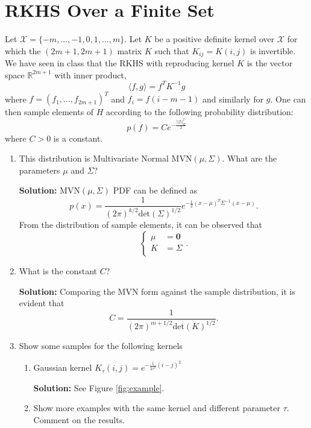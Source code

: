 \documentclass{article}[12pt]
\begin{document}
\section{RKHS Over a Finite Set}
Let $\mathcal{X} = \{-m,\ldots,-1,0,1,\ldots,m\}$. Let $K$ be a positive definite kernel over $\mathcal{X}$ for which the $(2m+1,2m+1)$ matrix $K$ such that $K_{ij}=K(i,j)$ is invertible. We have seen in class that the RKHS with reproducing kernel $K$ is the vector space $\mathbb{R}^{2m+1}$ with inner product, 
$$\langle f,g \rangle = f^T K^{-1}g $$
where $f=(f_1,\ldots,f_{2m+1})^T$ and $f_i=f(i-m-1)$ and similarly for $g$. 
One can then sample elements of $H$ according to the following probability distribution:  
$$p(f) = C e^{-\frac{||f||_H^2}{2}}$$
where $C>0$ is a constant. 
\begin{enumerate}
\item This distribution is Multivariate Normal MVN$(\mu,\Sigma)$. What are the parameters $\mu$ and $\Sigma$?

\textbf{Solution:} MVN$(\mu, \Sigma)$ PDF can be defined as 
	\begin{equation}
		p(x) = \frac{1}{(2\pi)^{k/2} \text{det}(\Sigma)^{1/2}} e^{- \frac{1}{2} (x-\mu)^T \Sigma^{-1} (x-\mu) }. 
	\end{equation}
From the distribution of sample elements, it can be observed that 
	\begin{equation}
		\begin{cases}
			\mu &= \mathbf 0 \\	
			K &= \Sigma \\
		\end{cases}.
	\end{equation}

\item What is the constant $C$?

\textbf{Solution:} Comparing the MVN form against the sample distribution, it is evident that 
	\begin{equation}
		C = \frac{1}{(2\pi)^{m+1/2} \text{det} (K)^{1/2}}. 
	\end{equation}
	
\item Show some samples for the following kernels
\begin{enumerate}
\item Gaussian kernel $K_\tau(i,j)=e^{-\frac{1}{2\tau^2}(i-j)^2}$

\textbf{Solution:} See Figure \ref{fig:example}.

\item Show more examples with the same kernel and different parameter $\tau$. Comment on the results. 


\end{enumerate}
\end{enumerate}
\end{document}
